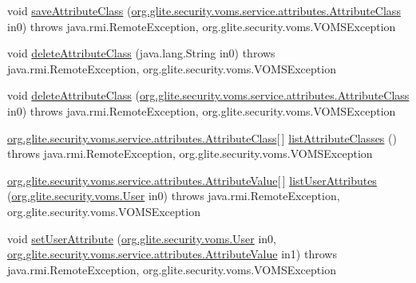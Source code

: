 \begin{DoxyCompactItemize}
void \hyperlink{classorg_1_1glite_1_1security_1_1voms_1_1service_1_1attributes_1_1VOMSAttributesSoapBindingStub_a3bbceb725199bd46368cf4374c65e1b5}{saveAttributeClass} (\hyperlink{classorg_1_1glite_1_1security_1_1voms_1_1service_1_1attributes_1_1AttributeClass}{org.glite.security.voms.service.attributes.AttributeClass} in0)  throws java.rmi.RemoteException, org.glite.security.voms.VOMSException 
\item 
void \hyperlink{classorg_1_1glite_1_1security_1_1voms_1_1service_1_1attributes_1_1VOMSAttributesSoapBindingStub_a79705aad11f32774a53d97fb5d54f7e4}{deleteAttributeClass} (java.lang.String in0)  throws java.rmi.RemoteException, org.glite.security.voms.VOMSException 
\item 
void \hyperlink{classorg_1_1glite_1_1security_1_1voms_1_1service_1_1attributes_1_1VOMSAttributesSoapBindingStub_a06ccc43eedfc083da47a6c7577493782}{deleteAttributeClass} (\hyperlink{classorg_1_1glite_1_1security_1_1voms_1_1service_1_1attributes_1_1AttributeClass}{org.glite.security.voms.service.attributes.AttributeClass} in0)  throws java.rmi.RemoteException, org.glite.security.voms.VOMSException 
\item 
\hyperlink{classorg_1_1glite_1_1security_1_1voms_1_1service_1_1attributes_1_1AttributeClass}{org.glite.security.voms.service.attributes.AttributeClass}\mbox{[}$\,$\mbox{]} \hyperlink{classorg_1_1glite_1_1security_1_1voms_1_1service_1_1attributes_1_1VOMSAttributesSoapBindingStub_a4fb8dfe7234d1cb9e96600e53b832a18}{listAttributeClasses} ()  throws java.rmi.RemoteException, org.glite.security.voms.VOMSException 
\item 
\hyperlink{classorg_1_1glite_1_1security_1_1voms_1_1service_1_1attributes_1_1AttributeValue}{org.glite.security.voms.service.attributes.AttributeValue}\mbox{[}$\,$\mbox{]} \hyperlink{classorg_1_1glite_1_1security_1_1voms_1_1service_1_1attributes_1_1VOMSAttributesSoapBindingStub_a0022b2e431a63c130309a75d460ac40d}{listUserAttributes} (\hyperlink{classorg_1_1glite_1_1security_1_1voms_1_1User}{org.glite.security.voms.User} in0)  throws java.rmi.RemoteException, org.glite.security.voms.VOMSException 
\item 
void \hyperlink{classorg_1_1glite_1_1security_1_1voms_1_1service_1_1attributes_1_1VOMSAttributesSoapBindingStub_ab254ed91121ce4570ab24c1673bca0c2}{setUserAttribute} (\hyperlink{classorg_1_1glite_1_1security_1_1voms_1_1User}{org.glite.security.voms.User} in0, \hyperlink{classorg_1_1glite_1_1security_1_1voms_1_1service_1_1attributes_1_1AttributeValue}{org.glite.security.voms.service.attributes.AttributeValue} in1)  throws java.rmi.RemoteException, org.glite.security.voms.VOMSException 

\end{DoxyCompactItemize}
